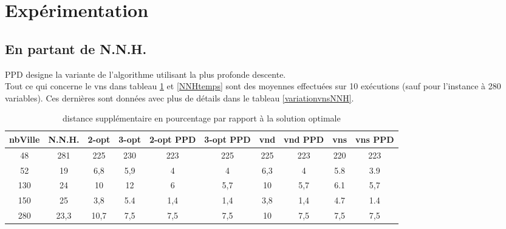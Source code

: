 \documentclass[12pt,a4paper]{article}
\begin{document}
\section{Expérimentation}
\subsection{En partant de N.N.H.}
PPD designe la variante de l'algorithme utilisant la plus profonde descente.\\
Tout ce qui concerne le vns dans tableau \ref{NNHpourcentageperf} et \ref{NNHtemps} sont des moyennes effectuées sur 10 exécutions (sauf pour l'instance à 280 variables). Ces dernières sont données avec plus de détails dans le tableau \ref{variationvnsNNH}.\\

\begin{table}[!h]
\centering
\begin{tabular}{|*{10}{c|}}
  \hline
  nbVille & N.N.H. & 2-opt & 3-opt & 2-opt PPD & 3-opt PPD & vnd & vnd PPD & vns & vns PPD \\
  \hline
  48 & 281 & 225 & 230 & 223 & 225 & 225 & 223 & 220 & 223 \\
  52 & 19 & 6,8 & 5,9 & 4 & 4 & 6,3 & 4 & 5.8 & 3.9 \\
  130 & 24 & 10 & 12 & 6 & 5,7 & 10 & 5,7 & 6.1 & 5,7 \\
  150 & 25 & 3,8 & 5.4 & 1,4 & 1,4 & 3,8 & 1,4 & 4.7 & 1.4 \\
  280 & 23,3 & 10,7 & 7,5 & 7,5 & 7,5 & 10 & 7,5 & 7,5 & 7,5 \\
  \hline
\end{tabular}
\caption{distance supplémentaire en pourcentage par rapport à la solution optimale}
\label{NNHpourcentageperf}
\end{table}
\end{document}
